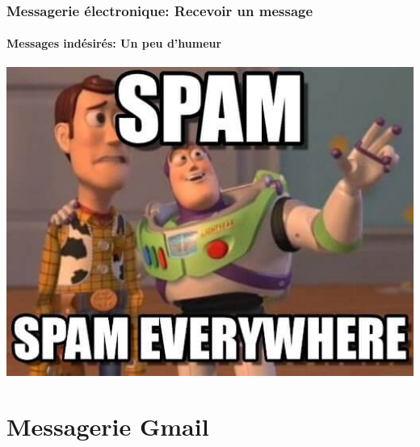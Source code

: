 \documentclass[xcolor=table]{beamer}
\begin{document}
\begin{frame}
\frametitle{Messagerie électronique: Recevoir un message}
\framesubtitle{Messages indésirés: Un peu d'humeur}

\begin{center}
	\includegraphics[height=.8\textheight]{..//img/Bweb02-ri-gmail/spam-humour.jpeg}
\end{center}

\end{frame}


\section{Messagerie Gmail}
\end{document}
